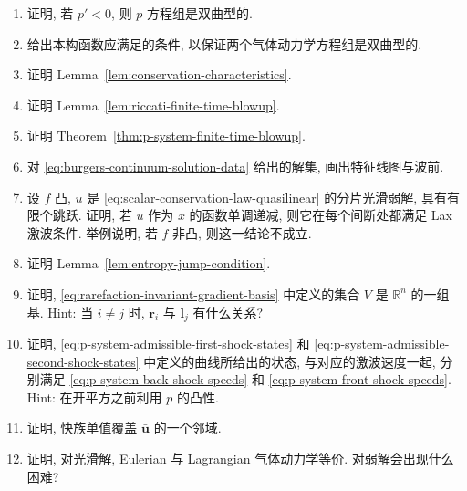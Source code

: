 \begin{enumerate}[label=\thesection.\arabic*.,ref=\thesection.\arabic*,start=1,series=book-problems]

\item\label{ex:p-system-hyperbolicity} 证明, 若 $p'<0$, 则 $p$ 方程组是双曲型的.

\item\label{ex:gas-dynamics-hyperbolicity} 给出本构函数应满足的条件, 以保证两个气体动力学方程组是双曲型的.

\item\label{ex:conservation-characteristics-proof} 证明 Lemma~\ref{lem:conservation-characteristics}.

\item\label{ex:riccati-blowup-proof} 证明 Lemma~\ref{lem:riccati-finite-time-blowup}.

\item\label{ex:p-system-blowup-proof} 证明 Theorem~\ref{thm:p-system-finite-time-blowup}.

\item\label{ex:sketch-mixed-rarefaction-shock} 对 \eqref{eq:burgers-continuum-solution-data} 给出的解集, 画出特征线图与波前.

\item\label{ex:convexity-lax-scalar-shock} 设 $f$ 凸, $u$ 是 \eqref{eq:scalar-conservation-law-quasilinear} 的分片光滑弱解, 具有有限个跳跃. 证明, 若 $u$ 作为 $x$ 的函数单调递减, 则它在每个间断处都满足 Lax 激波条件. 举例说明, 若 $f$ 非凸, 则这一结论不成立.

\item\label{ex:entropy-jump-condition-proof} 证明 Lemma~\ref{lem:entropy-jump-condition}.

\item\label{ex:riemann-invariant-gradient-basis} 证明, \eqref{eq:rarefaction-invariant-gradient-basis} 中定义的集合 $V$ 是 $\mathbb{R}^n$ 的一组基. Hint: 当 $i\ne j$ 时, $\bm{r}_i$ 与 $\bm{l}_j$ 有什么关系?

\item\label{ex:p-system-shock-reparametrization} 证明, \eqref{eq:p-system-admissible-first-shock-states} 和 \eqref{eq:p-system-admissible-second-shock-states} 中定义的曲线所给出的状态, 与对应的激波速度一起, 分别满足 \eqref{eq:p-system-back-shock-speeds} 和 \eqref{eq:p-system-front-shock-speeds}. Hint: 在开平方之前利用 $p$ 的凸性.

\item\label{ex:p-system-fast-family-covering} 证明, 快族单值覆盖 $\bar{\bm{u}}$ 的一个邻域.

\item\label{ex:eulerian-lagrangian-gas-equivalence} 证明, 对光滑解, Eulerian 与 Lagrangian 气体动力学等价. 对弱解会出现什么困难?

\end{enumerate}
